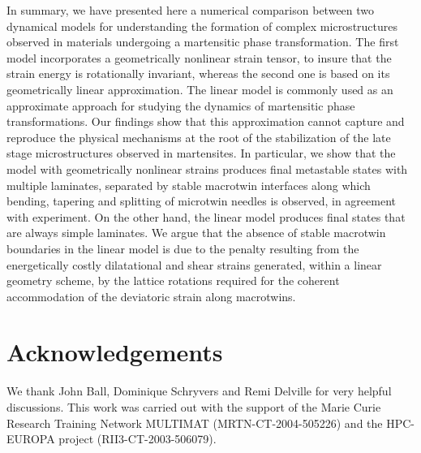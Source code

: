 \documentclass[twocolumn,amsmath,amssymb]{revtex4}
\begin{document}
In summary, we have presented here a numerical comparison between two dynamical models for  understanding the formation of complex microstructures observed in materials undergoing a martensitic phase transformation. The first model  incorporates a geometrically nonlinear strain tensor, to insure that the strain energy is rotationally invariant, whereas the second one is based on its  geometrically linear approximation. The linear model is  commonly used as an approximate approach for studying the dynamics of martensitic phase transformations. Our findings show that this approximation cannot capture and reproduce the physical mechanisms at the root of the stabilization of the late stage microstructures observed in martensites. In particular, we show that the model with geometrically nonlinear strains produces final metastable states with multiple laminates, separated by stable macrotwin interfaces along which bending, tapering and splitting of microtwin needles is observed, in agreement with experiment. On the other hand, the linear model produces final states that are always simple laminates. We argue that the absence of stable macrotwin boundaries in the linear model is due to the penalty resulting from the energetically costly dilatational and shear strains generated, within a linear geometry scheme, by the lattice rotations required for the coherent accommodation of the deviatoric strain along macrotwins.
%
%
%
 \section*{Acknowledgements}
 We thank John Ball, Dominique Schryvers and Remi Delville for very helpful discussions.  This work was carried out with the support of the Marie Curie Research Training Network MULTIMAT (MRTN-CT-2004-505226) and the HPC-EUROPA project (RII3-CT-2003-506079).
\end{document}
